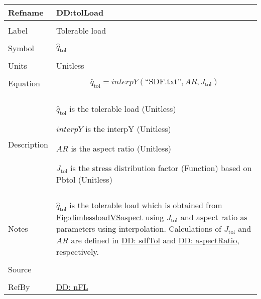 \documentclass[12pt]{article}
\begin{document}
\vspace{\baselineskip}
\noindent
\begin{minipage}{\textwidth}
\begin{tabular}{>{\raggedright}p{}>{\raggedright\arraybackslash}p{}}
\toprule \textbf{Refname} & \textbf{DD:tolLoad}
\label{DD:tolLoad}
\\ \midrule \\
Label & Tolerable load
        
\\ \midrule \\
Symbol & ${\hat{q}_{\text{tol}}}$
         
\\ \midrule \\
Units & Unitless
        
\\ \midrule \\
Equation & \begin{displaymath}
           {\hat{q}_{\text{tol}}}=interpY\left(\text{``SDF.txt''},AR,{J_{\text{tol}}}\right)
           \end{displaymath}
\\ \midrule \\
Description & \begin{symbDescription}
              \item{${\hat{q}_{\text{tol}}}$ is the tolerable load (Unitless)}
              \item{$interpY$ is the interpY (Unitless)}
              \item{$AR$ is the aspect ratio (Unitless)}
              \item{${J_{\text{tol}}}$ is the stress distribution factor (Function) based on Pbtol (Unitless)}
              \end{symbDescription}
\\ \midrule \\
Notes & ${\hat{q}_{\text{tol}}}$ is the tolerable load which is obtained from \hyperref[Figure:dimlessloadVSaspect]{Fig:dimlessloadVSaspect} using ${J_{\text{tol}}}$ and aspect ratio as parameters using interpolation. Calculations of ${J_{\text{tol}}}$ and $AR$ are defined in \hyperref[DD:sdfTol]{DD: sdfTol} and \hyperref[DD:aspectRatio]{DD: aspectRatio}, respectively.
        
\\ \midrule \\
Source & \cite{astm2009}
         
\\ \midrule \\
RefBy & \hyperref[DD:nFL]{DD: nFL}
        
\\ \bottomrule
\end{tabular}
\end{minipage}
\end{document}
